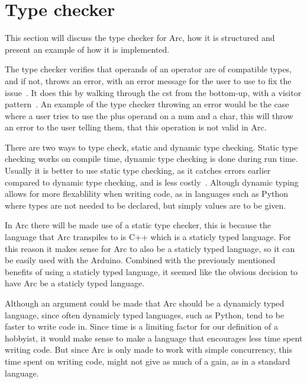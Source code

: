 \section{Type checker}\label{sec:typechecker}

This section will discuss the type checker for Arc, how it is structured and present an example of how it is implemented.

The type checker verifies that operands of an operator are of compatible types, and if not, throws an error, with an error message for the user to use to fix the issue~\cite{Sebesta2016}. It does this by walking through the \gls{cst} from the bottom-up, with a visitor pattern~\cite{Parr2014}. An example of the type checker throwing an error would be the case where a user tries to use the plus operand on a num and a char, this will throw an error to the user telling them, that this operation is not valid in Arc.

There are two ways to type check, static and dynamic type checking. Static type checking works on compile time, dynamic type checking is done during run time. Usually it is better to use static type checking, as it catches errors earlier compared to dynamic type checking, and is less costly~\cite{Sebesta2016}. Altough dynamic typing allows for more flexablility when writing code, as in languages such as Python where types are not needed to be declared, but simply values are to be given.

In Arc there will be made use of a static type checker, this is because the language that Arc transpiles to is C++ which is a staticly typed language. For this reason it makes sense for Arc to also be a staticly typed language, so it can be easily used with the Arduino. Combined with the previously mentioned benefits of using a staticly typed language, it seemed like the obvious decision to have Arc be a staticly typed language.

Although an argument could be made that Arc should be a dynamicly typed language, since often dynamicly typed languages, such as Python, tend to be faster to write code in. Since time is a limiting factor for our definition of a hobbyist, it would make sense to make a language that encourages less time spent writing code. But since Arc is only made to work with simple concurrency, this time spent on writing code, might not give as much of a gain, as in a standard language. 


